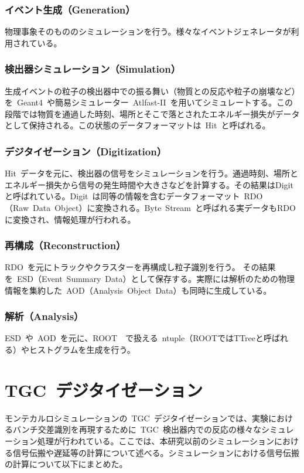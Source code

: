 \subsubsection{イベント生成（Generation）}
物理事象そのもののシミュレーションを行う。様々なイベントジェネレータが利用されている。

\subsubsection{検出器シミュレーション（Simulation）}
生成イベントの粒子の検出器中での振る舞い（物質との反応や粒子の崩壊など）を~Geant4~\cite{URL:22}や簡易シミュレーター~Atlfast-II~\cite{TR:08}を用いてシミュレートする。この段階では物質を通過した時刻、場所とそこで落とされたエネルギー損失がデータとして保持される。この状態のデータフォーマットは~Hit~と呼ばれる。

\subsubsection{デジタイゼーション（Digitization）}
Hit~データを元に、検出器の信号をシミュレーションを行う。通過時刻、場所とエネルギー損失から信号の発生時間や大きさなどを計算する。その結果はDigitと呼ばれている。Digit~は同等の情報を含むデータフォーマット~RDO（Raw~Data~Object）に変換される。Byte~Stream~と呼ばれる実データもRDOに変換され、情報処理が行われる。

\subsubsection{再構成（Reconstruction）}
RDO~を元にトラックやクラスターを再構成し粒子識別を行う。
その結果を~ESD（Event~Summary~Data）として保存する。実際には解析のための物理情報を集約した~AOD（Analysis~Object~Data）も同時に生成している。

\subsubsection{解析（Analysis）}
ESD~や~AOD~を元に、ROOT~\cite{URL:23}~で扱える~ntuple（ROOTではTTreeと呼ばれる）やヒストグラムを生成を行う。

\section{TGC~デジタイゼーション}
モンテカルロシミュレーションの~TGC~デジタイゼーションでは、実験におけるバンチ交差識別を再現するために~TGC~検出器内での反応の様々なシミュレーション処理が行われている。ここでは、本研究以前のシミュレーションにおける信号伝搬や遅延等の計算について述べる。シミュレーションにおける信号伝搬の計算について以下にまとめた。

